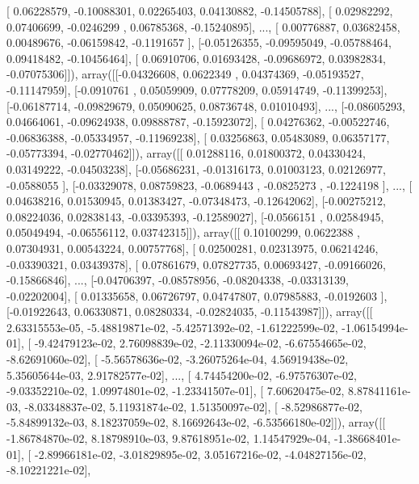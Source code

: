 \documentclass{article}
\begin{document}
       [ 0.06228579, -0.10088301,  0.02265403,  0.04130882, -0.14505788],
       [ 0.02982292,  0.07406699, -0.0246299 ,  0.06785368, -0.15240895],
       ..., 
       [ 0.00776887,  0.03682458,  0.00489676, -0.06159842, -0.1191657 ],
       [-0.05126355, -0.09595049, -0.05788464,  0.09418482, -0.10456464],
       [ 0.06910706,  0.01693428, -0.09686972,  0.03982834, -0.07075306]]), array([[-0.04326608,  0.0622349 ,  0.04374369, -0.05193527, -0.11147959],
       [-0.0910761 ,  0.05059909,  0.07778209,  0.05914749, -0.11399253],
       [-0.06187714, -0.09829679,  0.05090625,  0.08736748,  0.01010493],
       ..., 
       [-0.08605293,  0.04664061, -0.09624938,  0.09888787, -0.15923072],
       [ 0.04276362, -0.00522746, -0.06836388, -0.05334957, -0.11969238],
       [ 0.03256863,  0.05483089,  0.06357177, -0.05773394, -0.02770462]]), array([[ 0.01288116,  0.01800372,  0.04330424,  0.03149222, -0.04503238],
       [-0.05686231, -0.01316173,  0.01003123,  0.02126977, -0.0588055 ],
       [-0.03329078,  0.08759823, -0.0689443 , -0.0825273 , -0.1224198 ],
       ..., 
       [ 0.04638216,  0.01530945,  0.01383427, -0.07348473, -0.12642062],
       [-0.00275212,  0.08224036,  0.02838143, -0.03395393, -0.12589027],
       [-0.0566151 ,  0.02584945,  0.05049494, -0.06556112,  0.03742315]]), array([[ 0.10100299,  0.0622388 ,  0.07304931,  0.00543224,  0.00757768],
       [ 0.02500281,  0.02313975,  0.06214246, -0.03390321,  0.03439378],
       [ 0.07861679,  0.07827735,  0.00693427, -0.09166026, -0.15866846],
       ..., 
       [-0.04706397, -0.08578956, -0.08204338, -0.03313139, -0.02202004],
       [ 0.01335658,  0.06726797,  0.04747807,  0.07985883, -0.0192603 ],
       [-0.01922643,  0.06330871,  0.08280334, -0.02824035, -0.11543987]]), array([[  2.63315553e-05,  -5.48819871e-02,  -5.42571392e-02,
         -1.61222599e-02,  -1.06154994e-01],
       [ -9.42479123e-02,   2.76098839e-02,  -2.11330094e-02,
         -6.67554665e-02,  -8.62691060e-02],
       [ -5.56578636e-02,  -3.26075264e-04,   4.56919438e-02,
          5.35605644e-03,   2.91782577e-02],
       ..., 
       [  4.74454200e-02,  -6.97576307e-02,  -9.03352210e-02,
          1.09974801e-02,  -1.23341507e-01],
       [  7.60620475e-02,   8.87841161e-03,  -8.03348837e-02,
          5.11931874e-02,   1.51350097e-02],
       [ -8.52986877e-02,  -5.84899132e-03,   8.18237059e-02,
          8.16692643e-02,  -6.53566180e-02]]), array([[ -1.86784870e-02,   8.18798910e-03,   9.87618951e-02,
          1.14547929e-04,  -1.38668401e-01],
       [ -2.89966181e-02,  -3.01829895e-02,   3.05167216e-02,
         -4.04827156e-02,  -8.10221221e-02],
\end{document}
